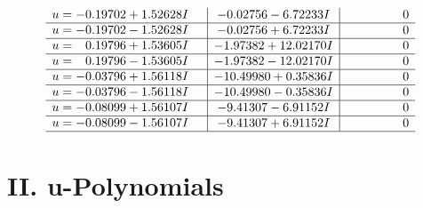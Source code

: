 \documentclass[1p]{elsarticle_modified}
\theoremstyle{definition}
\begin{document}
$$\begin{array}{c|c|c}
\begin{aligned}
u &= -0.19702 + 1.52628 I\end{aligned}
 & -0.02756 - 6.72233 I & \phantom{-0.000000 } 0 \\ \hline\begin{aligned}
u &= -0.19702 - 1.52628 I\end{aligned}
 & -0.02756 + 6.72233 I & \phantom{-0.000000 } 0 \\ \hline\begin{aligned}
u &= \phantom{-}0.19796 + 1.53605 I\end{aligned}
 & -1.97382 + 12.02170 I & \phantom{-0.000000 } 0 \\ \hline\begin{aligned}
u &= \phantom{-}0.19796 - 1.53605 I\end{aligned}
 & -1.97382 - 12.02170 I & \phantom{-0.000000 } 0 \\ \hline\begin{aligned}
u &= -0.03796 + 1.56118 I\end{aligned}
 & -10.49980 + 0.35836 I & \phantom{-0.000000 } 0 \\ \hline\begin{aligned}
u &= -0.03796 - 1.56118 I\end{aligned}
 & -10.49980 - 0.35836 I & \phantom{-0.000000 } 0 \\ \hline\begin{aligned}
u &= -0.08099 + 1.56107 I\end{aligned}
 & -9.41307 - 6.91152 I & \phantom{-0.000000 } 0 \\ \hline\begin{aligned}
u &= -0.08099 - 1.56107 I\end{aligned}
 & -9.41307 + 6.91152 I & \phantom{-0.000000 } 0\\
 \hline 
 \end{array}$$\newpage
\newpage\renewcommand{\arraystretch}{1}
\centering \section*{ II. u-Polynomials}
\end{document}
